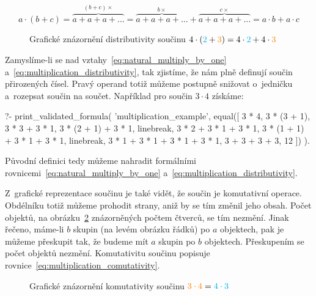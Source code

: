 \begin{equation}
\label{eq:multiplication_distributivity_proof}
a \cdot (b + c) = \overbrace{a + a + a + ...}^{(b + c) \times} = \overbrace{a + a + a + ...}^{b \times} + \overbrace{a + a + a + ...}^{c \times} = a \cdot b + a \cdot c
\end{equation}

\begin{figure}[!h]
\centering
{}
\caption{Grafické znázornění distributivity součinu \(4 \cdot (\textcolor{cyan}{2} + \textcolor{orange}{3}) = 4 \cdot \textcolor{cyan}{2} + 4 \cdot \textcolor{orange}{3}\)}
\label{img:multiplication_distributivity}
\end{figure}

Zamyslíme-li se nad vztahy~\eqref{eq:natural_multiply_by_one} a~\eqref{eq:multiplication_distributivity}, tak zjistíme, že nám plně definují součin přirozených čísel. Pravý operand totiž můžeme postupně snižovat o~jedničku a~rozepsat součin na součet. Například pro součin \(3 \cdot 4\) získáme:

\begin{prolog}
?-	print_validated_formula(
		'multiplication_example',
		equal([
			3 * 4,
			3 * (3 + 1),
			3 * 3 + 3 * 1,
			3 * (2 + 1) + 3 * 1,
			linebreak,
			3 * 2 + 3 * 1 + 3 * 1,
			3 * (1 + 1) + 3 * 1 + 3 * 1,
			linebreak,
			3 * 1 + 3 * 1 + 3 * 1 + 3 * 1,
			3 + 3 + 3 + 3,
			12
		])
	).				
\end{prolog}

Původní definici tedy můžeme nahradit formálními rovnicemi~\eqref{eq:natural_multiply_by_one} a~\eqref{eq:multiplication_distributivity}.

Z~grafické reprezentace součinu je také vidět, že součin je komutativní operace. Obdélníku totiž můžeme prohodit strany, aniž by se tím změnil jeho obsah. Počet objektů, na obrázku~\ref{img:multiplication_comutativity} znázorněných počtem čtverců, se tím nezmění. Jinak řečeno, máme-li \(b\) skupin (na levém obrázku řádků) po \(a\) objektech, pak je můžeme přeskupit tak, že budeme mít \(a\) skupin po \(b\) objektech. Přeskupením se počet objektů nezmění. Komutativitu součinu popisuje rovnice~\eqref{eq:multiplication_comutativity}.

\begin{figure}[!h]
\centering
{}
\caption{Grafické znázornění komutativity součinu \(\textcolor{orange}{3 \cdot 4} = \textcolor{cyan}{4 \cdot 3}\)}
\label{img:multiplication_comutativity}
\end{figure}

